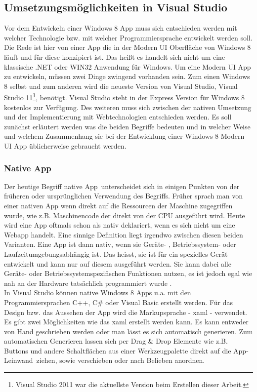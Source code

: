 \documentclass[12pt,a4paper,bibtotoc,abstracton]{scrartcl}
\begin{document}
\subsection{Umsetzungsmöglichkeiten in Visual Studio}
\label{subsec:nativ_vs_web}
Vor dem Entwickeln einer Windows 8 App muss sich entschieden werden mit welcher Technologie bzw. mit welcher Programmiersprache entwickelt werden soll. Die Rede ist hier von einer App die in der Modern UI Oberfläche von Windows 8 läuft und für diese konzipiert ist. Das heißt es handelt sich nicht um eine klassische .NET oder WIN32 Anwendung für Windows. Um eine Modern UI App zu entwickeln, müssen zwei Dinge zwingend vorhanden sein. Zum einen Windows 8 selbst und zum anderen wird die neueste Version von Visual Studio, Visual Studio 11\footnote{Visual Studio 2011 war die aktuellste Version beim Erstellen dieser Arbeit.}, benötigt. Visual Studio steht in der Express Version für Windows 8 kostenlos zur Verfügung. Des weiteren muss sich zwischen der nativen Umsetzung und der Implementierung mit Webtechnologien entschieden werden. Es soll zunächst erläutert werden was die beiden Begriffe bedeuten und in welcher Weise und welchem Zusammenhang sie bei der Entwicklung einer Windows 8 Modern UI App üblicherweise gebraucht werden.

\subsubsection{Native App}
\label{subsubsec:nativ}
Der heutige Begriff \glqq native App\grqq\ unterscheidet sich in einigen Punkten von der früheren oder ursprünglichen Verwendung des Begriffs. Früher sprach man von einer nativen App wenn direkt auf die Ressourcen der  Maschine zugegriffen wurde, wie z.B. Maschinencode der direkt von der CPU ausgeführt wird. Heute wird eine App oftmals schon als nativ deklariert, wenn es sich nicht um eine Webapp handelt. Eine sinnige Definition liegt irgendwo zwischen diesen beiden Varianten. Eine App ist dann nativ, wenn sie Geräte- , Betriebssystem- oder Laufzeitumgebungsabhängig ist. Das heisst, sie ist für ein spezielles Gerät entwickelt und kann nur auf diesem ausgeführt werden. Sie kann dabei alle Geräte- oder Betriebssystemspezifischen Funktionen nutzen, es ist jedoch egal wie nah an der Hardware tatsächlich programmiert wurde \citep{OBrian2013}.\\
In Visual Studio können native Windows 8  Apps u.a. mit den Programmiersprachen C++, C\# oder Visual Basic erstellt werden. Für das Design bzw. das Aussehen der App wird die Markupsprache - \ac{xaml} - verwendet. Es gibt zwei Möglichkeiten wie das \ac{xaml} erstellt werden kann. Es kann entweder von Hand geschrieben werden oder man lässt es sich automatisch generieren. Zum automatischen Generieren lassen sich per Drag \& Drop Elemente wie z.B. Buttons und andere Schaltflächen aus einer Werkzeugpalette direkt auf die \glqq App-Leinwand\grqq\ ziehen, sowie verschieben oder nach Belieben anordnen.
\end{document}
